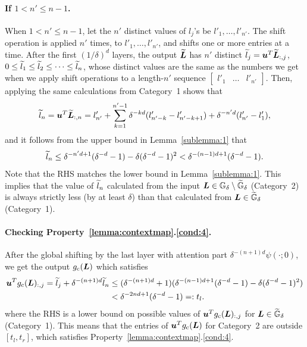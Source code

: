 \paragraph{If $1 < n' \leq n - 1$.}
When $1 < n' \leq n-1$, let the $n'$ distinct values of $l_j$'s be $l'_1, \dots, l'_{n'}$.
The shift operation is applied $n'$ times, to $l'_1, \dots, l'_{n'}$, and shifts one or more entries at a time. After the first $(1/\delta)^d$ layers, the output $\widetilde{{\bm{L}}}$ has $n'$ distinct $\widetilde{l}_j = {\bm{u}}^T \widetilde{{\bm{L}}}_{:,j}$, $0 \leq \widetilde{l}_1 \leq \widetilde{l}_2 \leq \dots \leq \widetilde{l}_n$, whose distinct values are the same as the numbers we get when we apply shift operations to a length-$n'$ sequence $\begin{bmatrix} l'_1 & \dots & l'_{n'} \end{bmatrix}$.
Then, applying the same calculations from Category~1 shows that
\begin{equation*}
    \widetilde{l}_n = 
    {\bm{u}}^T \widetilde{{\bm{L}}}_{:,n}
    =
    l'_{n'} + \sum_{k=1}^{n'-1} \delta^{-kd}(l'_{n'-k}-l'_{n'-k+1}) + \delta^{-n'd} (l'_{n'}-l'_1),
\end{equation*}
and it follows from the upper bound in Lemma~\ref{sublemma:1} that
\begin{equation*}
    \widetilde{l}_n
    \leq \delta^{-n'd + 1}(\delta^{-d}-1) - \delta (\delta^{-d} - 1)^2
    < \delta^{-(n-1)d + 1}(\delta^{-d}-1).
\end{equation*}
Note that the RHS matches the lower bound in Lemma~\ref{sublemma:1}.
This implies that the value of $\widetilde{l}_n$ calculated from the input ${\bm{L}} \in {\mathbb{G}}_{\delta}\setminus \widetilde{{\mathbb{G}}}_{\delta}$ (Category~2) is always strictly less (by at least $\delta$) than that calculated from ${\bm{L}} \in \widetilde{{\mathbb{G}}}_{\delta}$ (Category~1).

\paragraph{Checking Property~\ref{lemma:contextmap}.\ref{cond:4}.}
After the global shifting by the last layer with attention part $\delta^{-(n+1)d} \psi(\cdot;0)$, we get the output $g_{\rm c}({\bm{L}})$ which satisfies
\begin{align*}
    {\bm{u}}^T g_{\rm c}({\bm{L}})_{:,j} = \widetilde{l}_{j} + \delta^{-(n+1)d} \widetilde{l}_n
    &\leq (\delta^{-(n+1)d} + 1) (\delta^{-(n-1)d + 1}(\delta^{-d}-1) - \delta (\delta^{-d} - 1)^2)\\
    &< \delta^{-2nd+1}(\delta^{-d}-1) =: t_l.
\end{align*}
where the RHS is a lower bound on possible values of ${\bm{u}}^T g_{\rm c}({\bm{L}})_{:,j}$ for ${\bm{L}} \in \widetilde{{\mathbb{G}}}_{\delta}$ (Category~1).
This means that the entries of ${\bm{u}}^T g_{\rm c}({\bm{L}})$ for Category~2 are outside $[t_l, t_r]$, which satisfies Property~\ref{lemma:contextmap}.\ref{cond:4}.

